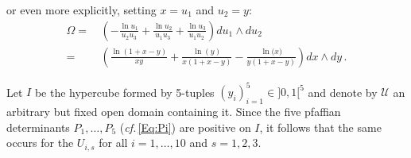 \documentclass[11pt]{amsart}
\begin{document}
or even more explicitly, setting $x=u_1$ and $u_2=y$: 
\begin{align}
\Omega= &\, 
\left( 
-\frac{\ln  u_{1}}{u_{2} u_{3}}
+\frac{\ln u_{2}}{u_{1} u_{3}}+\frac{\ln  u_{3}}{u_{1} u_{2}}
\right) du_1\wedge du_2
\nonumber
\\
= 
&\,
\left( 
\frac{\ln  \left(1+x-y\right)}{xy}
+\frac{\ln  \left(y\right)}{x(1+x-y) }
-\frac{\ln  \big(x\big)}{y(1+x-y) }
\right) dx\wedge dy\, .
\label{Eq:Omega-xy}
\end{align}


Let $I$ be the hypercube formed by 5-tuples $(y_i)_{i=1}^5 \in ]0,1[^5$ and denote by 
$\mathcal U$ an arbitrary but fixed open domain containing it. 
Since the five pfaffian determinants $P_1,\ldots,P_5$ ({\it cf.}\,\eqref{Eq:Pi}) are positive on $I$, it follows that the same occurs for the $U_{i,s}$ for all $i=1,\ldots,10$ and $s=1,2,3$. 
\end{document}
